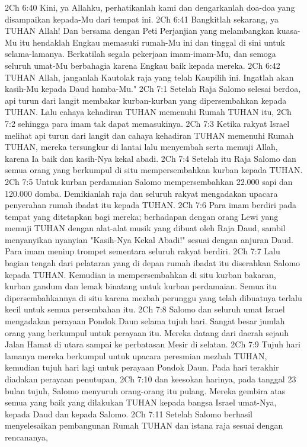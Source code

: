 2Ch 6:40  Kini, ya Allahku, perhatikanlah kami dan dengarkanlah doa-doa yang disampaikan kepada-Mu dari tempat ini.
2Ch 6:41  Bangkitlah sekarang, ya TUHAN Allah! Dan bersama dengan Peti Perjanjian yang melambangkan kuasa-Mu itu hendaklah Engkau memasuki rumah-Mu ini dan tinggal di sini untuk selama-lamanya. Berkatilah segala pekerjaan imam-imam-Mu, dan semoga seluruh umat-Mu berbahagia karena Engkau baik kepada mereka.
2Ch 6:42  TUHAN Allah, janganlah Kautolak raja yang telah Kaupilih ini. Ingatlah akan kasih-Mu kepada Daud hamba-Mu."
2Ch 7:1  Setelah Raja Salomo selesai berdoa, api turun dari langit membakar kurban-kurban yang dipersembahkan kepada TUHAN. Lalu cahaya kehadiran TUHAN memenuhi Rumah TUHAN itu,
2Ch 7:2  sehingga para imam tak dapat memasukinya.
2Ch 7:3  Ketika rakyat Israel melihat api turun dari langit dan cahaya kehadiran TUHAN memenuhi Rumah TUHAN, mereka tersungkur di lantai lalu menyembah serta memuji Allah, karena Ia baik dan kasih-Nya kekal abadi.
2Ch 7:4  Setelah itu Raja Salomo dan semua orang yang berkumpul di situ mempersembahkan kurban kepada TUHAN.
2Ch 7:5  Untuk kurban perdamaian Salomo mempersembahkan 22.000 sapi dan 120.000 domba. Demikianlah raja dan seluruh rakyat mengadakan upacara penyerahan rumah ibadat itu kepada TUHAN.
2Ch 7:6  Para imam berdiri pada tempat yang ditetapkan bagi mereka; berhadapan dengan orang Lewi yang memuji TUHAN dengan alat-alat musik yang dibuat oleh Raja Daud, sambil menyanyikan nyanyian "Kasih-Nya Kekal Abadi!" sesuai dengan anjuran Daud. Para imam meniup trompet sementara seluruh rakyat berdiri.
2Ch 7:7  Lalu bagian tengah dari pelataran yang di depan rumah ibadat itu diserahkan Salomo kepada TUHAN. Kemudian ia mempersembahkan di situ kurban bakaran, kurban gandum dan lemak binatang untuk kurban perdamaian. Semua itu dipersembahkannya di situ karena mezbah perunggu yang telah dibuatnya terlalu kecil untuk semua persembahan itu.
2Ch 7:8  Salomo dan seluruh umat Israel mengadakan perayaan Pondok Daun selama tujuh hari. Sangat besar jumlah orang yang berkumpul untuk perayaan itu. Mereka datang dari daerah sejauh Jalan Hamat di utara sampai ke perbatasan Mesir di selatan.
2Ch 7:9  Tujuh hari lamanya mereka berkumpul untuk upacara peresmian mezbah TUHAN, kemudian tujuh hari lagi untuk perayaan Pondok Daun. Pada hari terakhir diadakan perayaan penutupan,
2Ch 7:10  dan keesokan harinya, pada tanggal 23 bulan tujuh, Salomo menyuruh orang-orang itu pulang. Mereka gembira atas semua yang baik yang dilakukan TUHAN kepada bangsa Israel umat-Nya, kepada Daud dan kepada Salomo.
2Ch 7:11  Setelah Salomo berhasil menyelesaikan pembangunan Rumah TUHAN dan istana raja sesuai dengan rencananya,
